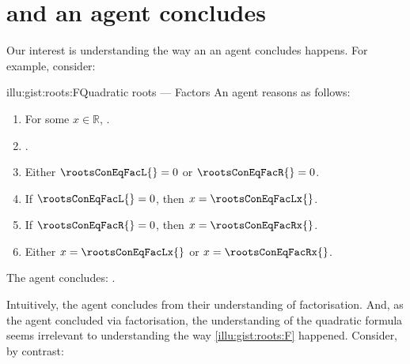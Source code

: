 \chapter{\qWhy{} and \qHow{} an agent concludes}
\label{cha:intro}


\begin{note}
  Our interest is understanding the way an  an agent concludes happens.
  For example, consider:

  \begin{rscenario}{illu:gist:roots:F}{Quadratic roots --- Factors}%
    An agent reasons as follows:
    \begin{enumerate}[label=\arabic*., ref=\arabic*]
    \item
      \label{illu:gist:roots:F:eq}
      For some \(x \in \mathbb{R}\), \rootsConEq{}.
    \item
      \label{illu:gist:roots:F:factor}
      \rootsConEqFac{}.
    \item
      \label{illu:gist:roots:F:zero}
      Either \(\rootsConEqFacL{} = 0\) or \(\rootsConEqFacR{} = 0\).
    \item
      \label{illu:gist:roots:F:case:a}
      If \(\rootsConEqFacL{} = 0\), then \(x = \rootsConEqFacLx{}\).
    \item
      \label{illu:gist:roots:F:case:b}
      If \(\rootsConEqFacR{} = 0\), then \(x = \rootsConEqFacRx{}\).
    \item
      \label{illu:gist:roots:F:factor:done}
      Either \(x = \rootsConEqFacLx{}\) or \(x = \rootsConEqFacRx{}\).
    \end{enumerate}
    The agent concludes:
    \rootsCon{}.
  \end{rscenario}

  \noindent%
  Intuitively, the agent concludes \propM{\rootsCon{}} from their understanding of factorisation.
  And, as the agent concluded via factorisation, the \agents{} understanding of the quadratic formula seems irrelevant to understanding the way \autoref{illu:gist:roots:F} happened.
  Consider, by contrast:


\end{note}
